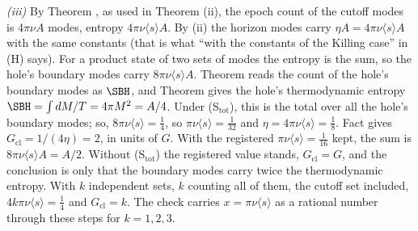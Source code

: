 \emph{(iii)} By Theorem , as used in Theorem (ii), the epoch count of the cutoff modes is $4\pi\nu A$ modes, entropy $4\pi\nu\langle s\rangle A$. By (ii) the horizon modes carry $\eta A = 4\pi\nu\langle s\rangle A$ with the same constants (that is what ``with the constants of the Killing case'' in (H) says). For a product state of two sets of modes the entropy is the sum, so the hole's boundary modes carry $8\pi\nu\langle s\rangle A$. Theorem  reads the count of the hole's boundary modes as $\SBH$, and Theorem  gives the hole's thermodynamic entropy $\SBH = \int dM/T = 4\pi M^{2} = A/4$. Under (S$_{\mathrm{tot}}$), this is the total over all the hole's boundary modes; so, $8\pi\nu\langle s\rangle = \tfrac14$, so $\pi\nu\langle s\rangle = \tfrac1{32}$ and $\eta = 4\pi\nu\langle s\rangle = \tfrac18$. Fact  gives $G_{\mathrm{cl}} = 1/(4\eta) = 2$, in units of $G$. With the registered $\pi\nu\langle s\rangle = \tfrac1{16}$ kept, the sum is $8\pi\nu\langle s\rangle A = A/2$. Without (S$_{\mathrm{tot}}$) the registered value stands, $G_{\mathrm{cl}} = G$, and the conclusion is only that the boundary modes carry twice the thermodynamic entropy. With $k$ independent sets, $k$ counting all of them, the cutoff set included, $4k\pi\nu\langle s\rangle = \tfrac14$ and $G_{\mathrm{cl}} = k$. The check carries $x = \pi\nu\langle s\rangle$ as a rational number through these steps for $k = 1, 2, 3$.

